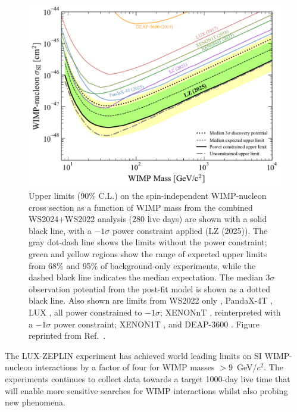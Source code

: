 \begin{figure}
    \centering
    \includegraphics[width=0.7\linewidth]{figures/WS2024Result/figure5.pdf}
    \caption[Upper limits (90\% C.L.) on the spin-independent WIMP-nucleon cross section as a function of WIMP mass from the combined WS2024+WS2022 analysis (280 live days).]{Upper limits (90\% C.L.) on the spin-independent WIMP-nucleon cross section as a function of WIMP mass from the combined WS2024+WS2022 analysis (280 live days) are shown with a solid black line, with a $-1\sigma$ power constraint applied (LZ (2025)). The gray dot-dash line shows the limits without the power constraint; green and yellow regions show the range of expected upper limits from 68\% and 95\% of background-only experiments, while the dashed black line indicates the median expectation. The median $3\sigma$ observation potential from the post-fit model is shown as a dotted black line. Also shown are limits from WS2022 only \cite{LZ:2022lsv}, PandaX-4T \cite{PandaX-4T:2021bab}, LUX \cite{LUX:2016ggv}, all power constrained to $-1\sigma$; XENONnT \cite{XENONnTPres}, reinterpreted with a $-1\sigma$ power constraint; XENON1T \cite{XENON2018}, and DEAP-3600 \cite{DEAP:2019yzn}. Figure reprinted from Ref.~\cite{LZCollaboration:2024lux}.}
    \label{fig:WS2024Result/fig5}
\end{figure}

The LUX-ZEPLIN experiment has achieved world leading limits on SI WIMP-nucleon interactions by a factor of four for WIMP masses $>9$~GeV/$c^2$. The experiments continues to collect data towards a target 1000-day live time that will enable more sensitive searches for WIMP interactions whilst also probing new phenomena.